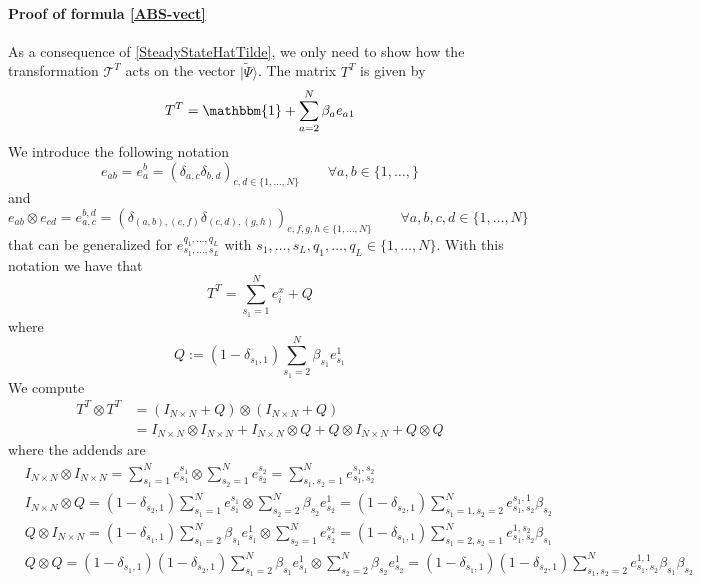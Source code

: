 \documentclass[11pt]{article}
\numberwithin{equation}{section}
\numberwithin{equation}{subsection}
\begin{document}
\paragraph{Proof of formula \eqref{ABS-vect}} As a consequence of \eqref{SteadyStateHatTilde}, we only need to show how the transformation $\mathcal{T}^{T}$ acts on the vector $|\widetilde{\Psi}\rangle$. The matrix $T^{T}$ is given by 
\begin{equation}
    T^{T}=\mathbbm{1}+\sum_{a=2}^{N}\beta_{a}e_{a1}
\end{equation}
We introduce the following notation
\begin{equation}\label{notation1}
    e_{ab}=e_{a}^{b}=\left(\delta_{a,c}\delta_{b,d}\right)_{c,d\in\{1,\ldots,N\}}\qquad \forall a,b\in \{1,\ldots,\}
\end{equation}
and 
\begin{equation}\label{notation2}
    e_{ab}\otimes e_{cd}=e_{a,c}^{b,d}=\left(\delta_{(a,b),(e,f)}\delta_{(c,d),(g,h)}\right)_{e,f,g,h\in \{1,\ldots,N\}}\qquad \forall a,b,c,d\in \{1,\ldots,N\}
    \end{equation}
    that can be generalized for $e_{s_{1},\ldots,s_{L}}^{q_{1},\ldots,q_{L}}$ with $s_{1},\ldots,s_{L},q_{1},\ldots,q_{L}\in \{1,\ldots,N\}$. With this notation we have that 
    \begin{equation}
        T^{T}=\sum_{s_{1}=1}^{N}e_{i}^{x}+Q
    \end{equation}
    where
    \begin{equation}
	Q:=(1-\delta_{s_{1},1})\sum_{s_{1}=2}^{N}\beta_{s_{1}}e_{s_{1}}^{1}
\end{equation}
We compute
\begin{equation}
    \begin{split}
        	T^{T}\otimes T^{T}&=\left(I_{N\times N}+Q\right)\otimes\left(I_{N\times N}+Q\right)
         \\&=
         I_{N\times N}\otimes I_{N\times N}+I_{N\times N}\otimes Q+Q\otimes I_{N\times N}+Q\otimes Q
    \end{split}
\end{equation}
where the addends are 
\begin{equation}
\begin{split}
	&I_{N\times N}\otimes I_{N\times N}=\sum_{s_{1}=1}^{N}e_{s_{1}}^{s_{1}}\otimes \sum_{s_{2}=1}^{N}e_{s_{2}}^{s_{2}}=\sum_{s_{1},s_{2}=1}^{N}e_{s_{1},s_{2}}^{s_{1},s_{2}}\\
	&I_{N\times N}\otimes Q=(1-\delta_{s_{2},1})\sum_{s_{1}=1}^{N}e_{s_{1}}^{s_{1}}\otimes \sum_{s_{2}=2}^{N}\beta_{s_{2}}e_{s_{2}}^{1}=(1-\delta_{s_{2},1})\sum_{s_{1}=1,s_{2}=2}^{N}e_{s_{1},s_{2}}^{s_{1},1}\beta_{s_{2}}\\
	&Q\otimes I_{N\times N}=(1-\delta_{s_{1},1})\sum_{s_{1}=2}^{N}\beta_{s_{1}}e_{s_{1}}^{1}\otimes \sum_{s_{2}=1}^{N}e_{s_{2}}^{s_{2}}=(1-\delta_{s_{1},1})\sum_{s_{1}=2,s_{2}=1}^{N}e_{s_{1},s_{2}}^{1,s_{2}}\beta_{s_{1}}\\
	&Q\otimes Q=(1-\delta_{s_{1},1})(1-\delta_{s_{2},1})\sum_{s_{1}=2}^{N}\beta_{s_{1}}e_{s_{1}}^{1}\otimes \sum_{s_{2}=2}^{N}\beta_{s_{2}}e_{s_{2}}^{1}=(1-\delta_{s_{1},1})(1-\delta_{s_{2},1})\sum_{s_{1},s_{2}=2}^{N}e_{s_{1},s_{2}}^{1,1}\beta_{s_{1}}\beta_{s_{2}}
 \end{split}
\end{equation}
\end{document}

